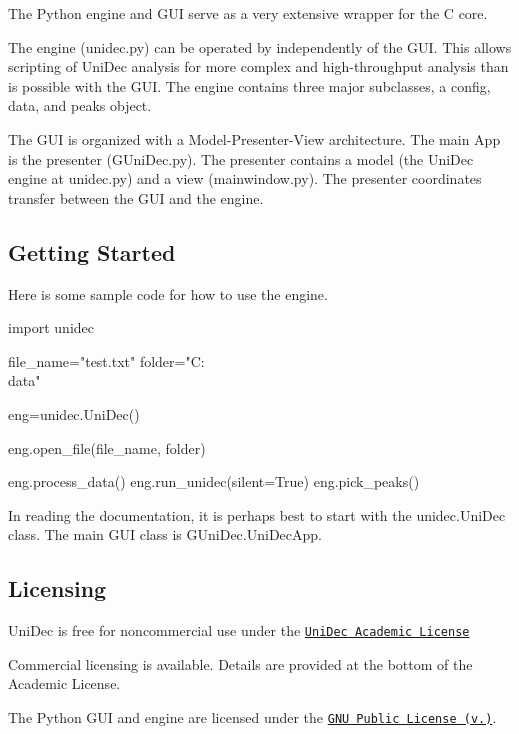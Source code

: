 The Python engine and G\+U\+I serve as a very extensive wrapper for the C core.

The engine (unidec.\+py) can be operated by independently of the G\+U\+I. This allows scripting of Uni\+Dec analysis for more complex and high-\/throughput analysis than is possible with the G\+U\+I. The engine contains three major subclasses, a config, data, and peaks object.

The G\+U\+I is organized with a Model-\/\+Presenter-\/\+View architecture. The main App is the presenter (G\+Uni\+Dec.\+py). The presenter contains a model (the Uni\+Dec engine at unidec.\+py) and a view (mainwindow.\+py). The presenter coordinates transfer between the G\+U\+I and the engine.

\subsection*{Getting Started}

Here is some sample code for how to use the engine. \begin{DoxyVerb}import unidec

file_name="test.txt"
folder="C:\\data"

eng=unidec.UniDec()

eng.open_file(file_name, folder)

eng.process_data()
eng.run_unidec(silent=True)
eng.pick_peaks()
\end{DoxyVerb}


In reading the documentation, it is perhaps best to start with the unidec.\+Uni\+Dec class. The main G\+U\+I class is G\+Uni\+Dec.\+Uni\+Dec\+App.

\subsection*{Licensing}

Uni\+Dec is free for noncommercial use under the \href{http://unidec.chem.ox.ac.uk/12116_UniDec_Academic%20Use%20Licence.pdf}{\tt Uni\+Dec Academic License}

Commercial licensing is available. Details are provided at the bottom of the Academic License.

The Python G\+U\+I and engine are licensed under the \href{http://www.gnu.org/licenses/gpl-3.0.en.html}{\tt G\+N\+U Public License (v.)}. 
